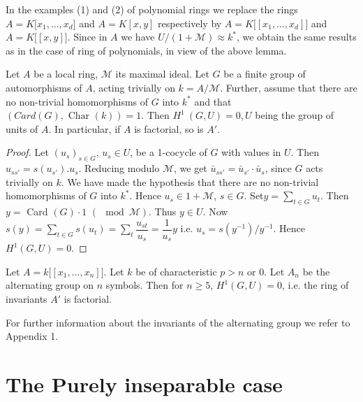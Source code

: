     
    In the examples (1) and (2) of polynomial rings we replace the
    rings $A = K \big[x_1, \ldots , x_d \big]$ and $A = K [x, y]$
    respectively by $A = K \big[[  x_1, \ldots , x_d]\big]$ and $A =
    K \big[[x, y ] \big]$. Since in $A$ we have $U \big/(1+
    \mathscr{M}) \approx k^*$, we obtain the same results as in the
    case of ring of polynomials, in view of the above lemma. 
    
\setcounter{prop}{2}
\begin{prop}\label{chap3:prop1.3} %
Let $A$ be a local ring, $\mathscr{M}$ its maximal ideal. Let $G$
  be a finite group of automorphisms of $A$, acting trivially on $k =
  A/\mathscr{M}$. Further, assume that there are no non-trivial
  homomorphisms of $G$ into $k^*$ and that $(Card (G), \text{ Char }
  (k)) = 1$. Then $H^1 ~ (G, U) = 0, U $ being the group of units of
  $A$. In particular, if $A$ is factorial, so is $A'$. 
    \end{prop} 
       
    \begin{proof}
Let $(u_s)_{s \in G}$, $u_s \in U$, be a 1-cocycle of $G$ with values
in $U$. Then $u_{ss'} = s(u_{s'}). u_s$. Reducing modulo
$\mathscr{M}$, we get $\bar{u}_{ss'} = \bar{u}_{s'} \cdot \bar{u}_s$,
since $G$ acts trivially on $k$. We have made the hypothesis that
there are no non-trivial homomorphisms of $G$ into $k^*$. Hence $u_s
\in 1 + \mathscr{M}$, $s \in G$. Set\pageoriginale $y = \sum\limits_{t
  \in G} 
u_t$. Then $y = $ Card $(G)\cdot 1$ $(\mod \mathscr{M})$. Thus $y \in
U$. Now $s (y) = \sum\limits_{ t\in G} s(u_t) = \sum\limits_{t}
\dfrac{u_{st}}{u_s} = \dfrac{1}{u_s} y $ i.e. $u_s = s(y^{-1}) \big/
y^{-1}$. Hence $H^1 (G, U) = 0$. 
\end{proof}   
     
\begin{coro*} %
Let $A = k \big[[x_1, \ldots , x_n ]\big]$. Let $k$ be of
characteristic $p > n$ or 0. Let $A_n$ be the alternating group on
$n$ symbols. Then for $n \ge 5$, $H^1 (G, U) = 0$, i.e. the ring of
invariants $A'$ is factorial. 
    \end{coro*}    
    
    For further information about the invariants of the alternating
    group we refer to Appendix 1. 
    

\section{The Purely inseparable case}\label{chap3:sec2}%
 
